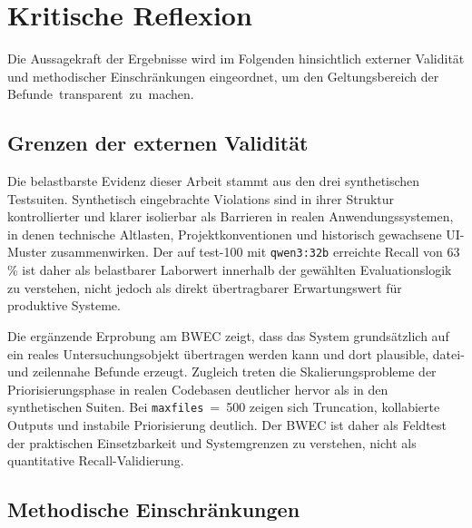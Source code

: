 \section{Kritische Reflexion}
\label{sec:fazit_reflexion}

Die Aussagekraft der Ergebnisse wird im Folgenden hinsichtlich externer Validität und methodischer Einschränkungen eingeordnet, um den Geltungsbereich der \mbox{Befunde transparent zu machen.}

\subsection{Grenzen der externen Validität}
\label{sec:fazit_extern}

Die belastbarste Evidenz dieser Arbeit stammt aus den drei synthetischen Testsuiten. Synthetisch eingebrachte Violations sind in ihrer Struktur kontrollierter und klarer isolierbar als Barrieren in realen Anwendungssystemen, in denen technische Altlasten, Projektkonventionen und historisch gewachsene \acs{UI}-Muster zusammenwirken. Der auf test-100 mit \texttt{qwen3:32b} erreichte Recall von 63\,\% ist daher als belastbarer Laborwert innerhalb der gewählten Evaluationslogik zu verstehen, nicht jedoch als direkt übertragbarer Erwartungswert für produktive Systeme.

Die ergänzende Erprobung am \ac{BWEC} zeigt, dass das System grundsätzlich auf ein reales Untersuchungsobjekt übertragen werden kann und dort plausible, datei- und zeilennahe Befunde erzeugt. Zugleich treten die Skalierungsprobleme der Priorisierungsphase in realen Codebasen deutlicher hervor als in den synthetischen Suiten. Bei \texttt{maxfiles}~=~500 zeigen sich Trunca\-tion, kollabierte Outputs und instabile Priorisierung deutlich. Der \ac{BWEC} ist daher als Feldtest der praktischen Einsetzbarkeit und Systemgrenzen zu verstehen, nicht als quantitative Recall-Validierung.

\subsection{Methodische Einschränkungen}
\label{sec:fazit_intern}

